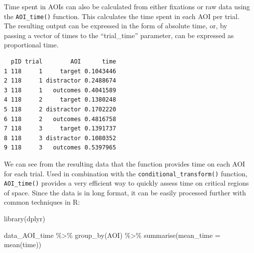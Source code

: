 \documentclass[
  man,
  floatsintext,
  longtable,
  nolmodern,
  notxfonts,
  notimes,
  colorlinks=true,linkcolor=blue,citecolor=blue,urlcolor=blue]{apa7}
\newenvironment{Shaded}{\begin{snugshade}}{\end{snugshade}}
\newcommand{\AttributeTok}[1]{\textcolor[rgb]{0.40,0.45,0.13}{#1}}
\newcommand{\ConstantTok}[1]{\textcolor[rgb]{0.56,0.35,0.01}{#1}}
\newcommand{\DecValTok}[1]{\textcolor[rgb]{0.68,0.00,0.00}{#1}}
\newcommand{\FunctionTok}[1]{\textcolor[rgb]{0.28,0.35,0.67}{#1}}
\newcommand{\NormalTok}[1]{\textcolor[rgb]{0.00,0.23,0.31}{#1}}
\newcommand{\OtherTok}[1]{\textcolor[rgb]{0.00,0.23,0.31}{#1}}
\newcommand{\SpecialCharTok}[1]{\textcolor[rgb]{0.37,0.37,0.37}{#1}}
\newcommand{\StringTok}[1]{\textcolor[rgb]{0.13,0.47,0.30}{#1}}
\begin{document}
Time spent in AOIs can also be calculated from either fixations or raw
data using the \texttt{AOI\_time()} function. This calculates the time
spent in each AOI per trial. The resulting output can be expressed in
the form of absolute time, or, by passing a vector of times to the
``trial\_time'' parameter, can be expressed as proportional time.

\begin{Shaded}
\end{Shaded}

\begin{verbatim}
  pID trial        AOI      time
1 118     1     target 0.1043446
2 118     1 distractor 0.2488674
3 118     1   outcomes 0.4041589
4 118     2     target 0.1380248
5 118     2 distractor 0.1702220
6 118     2   outcomes 0.4816758
7 118     3     target 0.1391737
8 118     3 distractor 0.1080352
9 118     3   outcomes 0.5397965
\end{verbatim}

We can see from the resulting data that the function provides time on
each AOI for each trial. Used in combination with the
\texttt{conditional\_transform()} function, \texttt{AOI\_time()}
provides a very efficient way to quickly assess time on critical regions
of space. Since the data is in long format, it can be easily processed
further with common techniques in R:

\begin{Shaded}
\begin{Highlighting}[]
\FunctionTok{library}\NormalTok{(dplyr)}

\NormalTok{data\_AOI\_time }\SpecialCharTok{\%\textgreater{}\%} 
  \FunctionTok{group\_by}\NormalTok{(AOI) }\SpecialCharTok{\%\textgreater{}\%} 
  \FunctionTok{summarise}\NormalTok{(}\AttributeTok{mean\_time =} \FunctionTok{mean}\NormalTok{(time))}
\end{Highlighting}
\end{Shaded}
\end{document}
